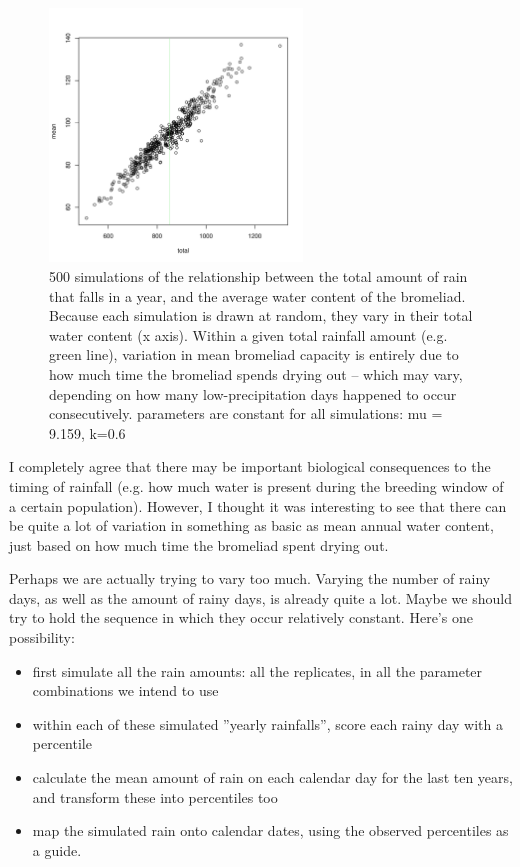 \documentclass[10pt]{article}
\begin{document}
\begin{spacing}{1.5}
\begin{figure}
  \centering
  \includegraphics[width=0.6\textwidth]{totalmean.pdf}
  \caption{500 simulations of the relationship between the total
    amount of rain that falls in a year, and the average water content
    of the bromeliad.  Because each simulation is drawn at random,
    they vary in their total water content (x axis).  Within a given
    total rainfall amount (e.g. green line), variation in mean
    bromeliad capacity is entirely due to how much time the bromeliad
    spends drying out -- which may vary, depending on how many
    low-precipitation days happened to occur consecutively. parameters
    are constant for all simulations: mu = 9.159, k=0.6}
\end{figure}

I completely agree that there may be important biological consequences
to the timing of rainfall (e.g. how much water is present during the
breeding window of a certain population).  However, I thought it was
interesting to see that there can be quite a lot of variation in
something as basic as mean annual water content, just based on how
much time the bromeliad spent drying out.  

Perhaps we are actually trying to vary too much.  Varying the number
of rainy days, as well as the amount of rainy days, is already quite a
lot.  Maybe we should try to hold the sequence in which they occur
relatively constant.  Here's one possibility:
\begin{itemize}
\item first simulate all the rain amounts: all the replicates, in all
  the parameter combinations we intend to use
\item within each of these simulated ''yearly rainfalls'', score each
  rainy day with a percentile
\item calculate the mean amount of rain on each calendar day for the
  last ten years, and transform these into percentiles too
\item map the simulated rain onto calendar dates, using the observed
  percentiles as a guide.
\end{itemize}


\end{spacing}
\end{document}
